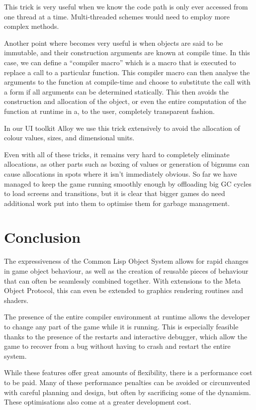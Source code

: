 \documentclass[a4paper]{paper}
\begin{document}
This trick is very useful when we know the code path is only ever accessed from one thread at a time. Multi-threaded schemes would need to employ more complex methods.

Another point where  becomes very useful is when objects are said to be immutable, and their construction arguments are known at compile time. In this case, we can define a ``compiler macro'' which is a macro that is executed to replace a call to a particular function. This compiler macro can then analyse the arguments to the function at compile-time and choose to substitute the call with a  form if all arguments can be determined statically. This then avoids the construction and allocation of the object, or even the entire computation of the function at runtime in a, to the user, completely transparent fashion.

In our UI toolkit Alloy we use this trick extensively to avoid the allocation of colour values, sizes, and dimensional units.

Even with all of these tricks, it remains very hard to completely eliminate allocations, as other parts such as boxing of values or generation of bignums can cause allocations in spots where it isn't immediately obvious. So far we have managed to keep the game running smoothly enough by offloading big GC cycles to load screens and transitions, but it is clear that bigger games do need additional work put into them to optimise them for garbage management.

\section{Conclusion}
The expressiveness of the Common Lisp Object System allows for rapid changes in game object behaviour, as well as the creation of reusable pieces of behaviour that can often be seamlessly combined together. With extensions to the Meta Object Protocol, this can even be extended to graphics rendering routines and shaders.

The presence of the entire compiler environment at runtime allows the developer to change any part of the game while it is running. This is especially feasible thanks to the presence of the restarts and interactive debugger, which allow the game to recover from a bug without having to crash and restart the entire system.

While these features offer great amounts of flexibility, there is a performance cost to be paid. Many of these performance penalties can be avoided or circumvented with careful planning and design, but often by sacrificing some of the dynamism. These optimisations also come at a greater development cost.
\end{document}

